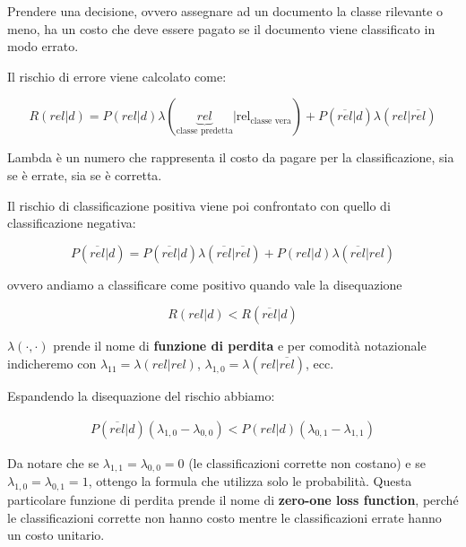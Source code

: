 

Prendere una decisione, ovvero assegnare ad un documento la classe rilevante o meno, ha un costo che deve essere pagato se il documento viene classificato in modo errato.

Il rischio di errore viene calcolato come:

$$
R(rel | d) = P(rel | d) \lambda (\underbrace{rel}_{\text{classe predetta}} | \text{rel}_{\text{classe vera}}) + P(\overline{rel} |d) \lambda (rel | \overline{rel})
$$

\noindent Lambda è un numero che rappresenta il costo da pagare per la classificazione, sia se è errate, sia se è corretta.

Il rischio di classificazione positiva viene poi confrontato con quello di classificazione negativa:

$$
P(\overline{rel} | d) = P(\overline{rel}|d)\lambda(\overline{rel}|\overline{rel}) + P(rel|d)\lambda(\overline{rel}|rel)
$$

\noindent ovvero andiamo a classificare come positivo quando vale la disequazione

$$
R(rel|d) < R(\overline{rel}|d)
$$

\noindent $\lambda(\cdot, \cdot)$ prende il nome di \textbf{funzione di perdita} e per comodità notazionale indicheremo con $\lambda_{11} = \lambda (rel | rel)$, $\lambda_{1,0} =\lambda (rel | \overline{rel})$, ecc.

Espandendo la disequazione del rischio abbiamo:

\begin{align*}
P(\overline{rel}|d)(\lambda_{1,0} - \lambda_{0,0}) < P(rel|d)(\lambda_{0,1} - \lambda_{1,1})
\end{align*}

\noindent Da notare che se $\lambda_{1,1} = \lambda_{0,0} = 0$ (le classificazioni corrette non costano) e se $\lambda_{1,0} = \lambda_{0,1} = 1$, ottengo la formula che utilizza solo le probabilità. Questa particolare funzione di perdita prende il nome di \textbf{zero-one loss function}, perché le classificazioni corrette non hanno costo mentre le classificazioni errate hanno un costo unitario.

